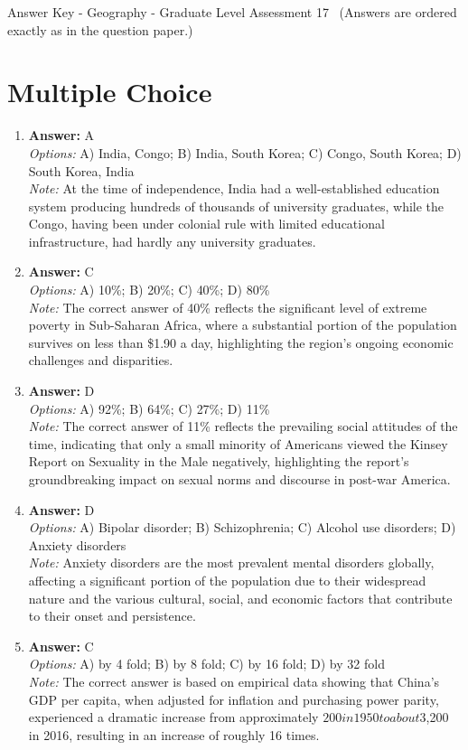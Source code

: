 \documentclass[12pt]{article}
\begin{document}
\begin{center}
Answer Key - Geography - Graduate Level Assessment 17 \
\small (Answers are ordered exactly as in the question paper.)
\end{center}

\section*{Multiple Choice}
\begin{enumerate}[label=\arabic*.]
\item \textbf{Answer:} A
\\ \textit{Options:} A) India, Congo; B) India, South Korea; C) Congo, South Korea; D) South Korea, India
\\ \textit{Note:} At the time of independence, India had a well-established education system producing hundreds of thousands of university graduates, while the Congo, having been under colonial rule with limited educational infrastructure, had hardly any university graduates.
\item \textbf{Answer:} C
\\ \textit{Options:} A) 10\%; B) 20\%; C) 40\%; D) 80\%
\\ \textit{Note:} The correct answer of 40\% reflects the significant level of extreme poverty in Sub-Saharan Africa, where a substantial portion of the population survives on less than \$1.90 a day, highlighting the region's ongoing economic challenges and disparities.
\item \textbf{Answer:} D
\\ \textit{Options:} A) 92\%; B) 64\%; C) 27\%; D) 11\%
\\ \textit{Note:} The correct answer of 11\% reflects the prevailing social attitudes of the time, indicating that only a small minority of Americans viewed the Kinsey Report on Sexuality in the Male negatively, highlighting the report's groundbreaking impact on sexual norms and discourse in post-war America.
\item \textbf{Answer:} D
\\ \textit{Options:} A) Bipolar disorder; B) Schizophrenia; C) Alcohol use disorders; D) Anxiety disorders
\\ \textit{Note:} Anxiety disorders are the most prevalent mental disorders globally, affecting a significant portion of the population due to their widespread nature and the various cultural, social, and economic factors that contribute to their onset and persistence.
\item \textbf{Answer:} C
\\ \textit{Options:} A) by 4 fold; B) by 8 fold; C) by 16 fold; D) by 32 fold
\\ \textit{Note:} The correct answer is based on empirical data showing that China's GDP per capita, when adjusted for inflation and purchasing power parity, experienced a dramatic increase from approximately $200 in 1950 to about $3,200 in 2016, resulting in an increase of roughly 16 times.
\end{enumerate}
\end{document}
